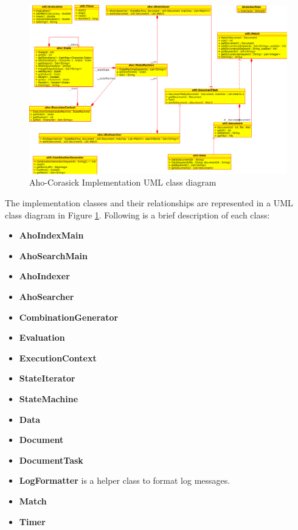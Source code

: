 \documentclass[10pt]{report}
\begin{document}
\begin{figure}
  \begin{center}
	\includegraphics[angle=90,width=\textwidth,height=!]{ahouml}
  \end{center}
  \caption{Aho-Corasick Implementation UML class diagram}
  \label{fig:ahouml}
\end{figure} 

The implementation classes and their relationships are represented in a UML
class diagram in Figure \ref{fig:ahouml}. Following is a brief
description of each class:

\begin{itemize}
\item \textbf{AhoIndexMain}

\item \textbf{AhoSearchMain} 

\item \textbf{AhoIndexer}

\item \textbf{AhoSearcher} 

\item \textbf{CombinationGenerator}

\item \textbf{Evaluation}

\item \textbf{ExecutionContext} 

\item \textbf{StateIterator} 

\item \textbf{StateMachine} 

\item \textbf{Data} 

\item \textbf{Document} 

\item \textbf{DocumentTask} 

\item \textbf{LogFormatter} is a helper class to format log messages.

\item \textbf{Match}

\item \textbf{Timer}

\end{itemize}
\end{document}
